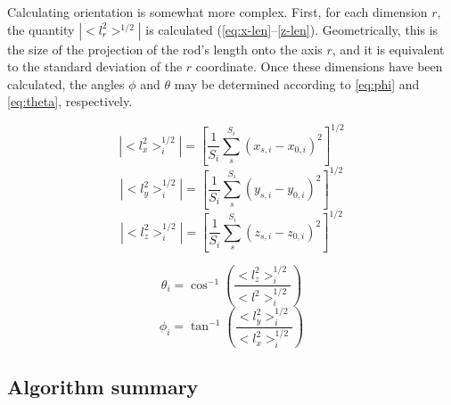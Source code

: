Calculating orientation is somewhat more complex.  First, for each dimension $r$, the quantity
$|<l_r^2>^{1/2}|$ is calculated (\ref{eq:x-len}--\ref{z-len}). 
Geometrically, this is the size of the projection of the rod's length
onto the axis $r$, and it is equivalent to the standard deviation of the $r$ coordinate.
Once these dimensions have been calculated, the angles $\phi$ and $\theta$ may be 
determined according to \ref{eq:phi} and \ref{eq:theta}, respectively.

\begin{equation}
\label{eq:x-len}
|<l_x^2>_i^{1/2}| = \left[\frac{1}{S_i} \sum_s^{S_i} (x_{s,i} - x_{0,i} )^2 \right]^{1/2}
\end{equation}
\begin{equation}
\label{eq:y-len}
|<l_y^2>_i^{1/2}| = \left[\frac{1}{S_i} \sum_s^{S_i} (y_{s,i} - y_{0,i} )^2 \right]^{1/2}
\end{equation}
\begin{equation}
\label{eq:z-len}
|<l_z^2>_i^{1/2}| = \left[\frac{1}{S_i} \sum_s^{S_i} (z_{s,i} - z_{0,i} )^2 \right]^{1/2}
\end{equation}

\begin{equation}
\label{eq:theta}
\theta_i = \cos^{-1} \left(\frac{<l_z^2>_i^{1/2}}{<l^2>_i^{1/2}} \right)
\end{equation}
\begin{equation}
\label{eq:phi}
\phi_i = \tan^{-1} \left(\frac{<l_y^2>_i^{1/2}}{<l_x^2>_i^{1/2}} \right)
\end{equation}

\subsection{Algorithm summary}

